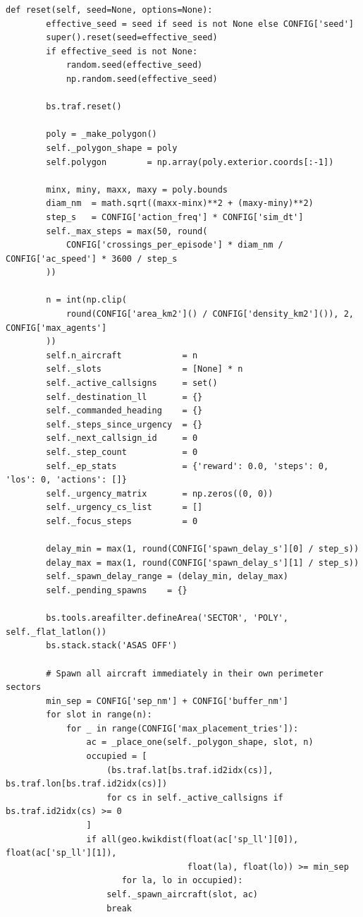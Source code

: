 \documentclass[10pt, a4paper]{article}
\begin{document}
\begin{lstlisting}[caption={v3\_simple\_env.py --- ATCO conflict-resolution environment}, label=lst:env]
    def reset(self, seed=None, options=None):
        effective_seed = seed if seed is not None else CONFIG['seed']
        super().reset(seed=effective_seed)
        if effective_seed is not None:
            random.seed(effective_seed)
            np.random.seed(effective_seed)

        bs.traf.reset()

        poly = _make_polygon()
        self._polygon_shape = poly
        self.polygon        = np.array(poly.exterior.coords[:-1])

        minx, miny, maxx, maxy = poly.bounds
        diam_nm  = math.sqrt((maxx-minx)**2 + (maxy-miny)**2)
        step_s   = CONFIG['action_freq'] * CONFIG['sim_dt']
        self._max_steps = max(50, round(
            CONFIG['crossings_per_episode'] * diam_nm / CONFIG['ac_speed'] * 3600 / step_s
        ))

        n = int(np.clip(
            round(CONFIG['area_km2']() / CONFIG['density_km2']()), 2, CONFIG['max_agents']
        ))
        self.n_aircraft            = n
        self._slots                = [None] * n
        self._active_callsigns     = set()
        self._destination_ll       = {}
        self._commanded_heading    = {}
        self._steps_since_urgency  = {}
        self._next_callsign_id     = 0
        self._step_count           = 0
        self._ep_stats             = {'reward': 0.0, 'steps': 0, 'los': 0, 'actions': []}
        self._urgency_matrix       = np.zeros((0, 0))
        self._urgency_cs_list      = []
        self._focus_steps          = 0

        delay_min = max(1, round(CONFIG['spawn_delay_s'][0] / step_s))
        delay_max = max(1, round(CONFIG['spawn_delay_s'][1] / step_s))
        self._spawn_delay_range = (delay_min, delay_max)
        self._pending_spawns    = {}

        bs.tools.areafilter.defineArea('SECTOR', 'POLY', self._flat_latlon())
        bs.stack.stack('ASAS OFF')

        # Spawn all aircraft immediately in their own perimeter sectors
        min_sep = CONFIG['sep_nm'] + CONFIG['buffer_nm']
        for slot in range(n):
            for _ in range(CONFIG['max_placement_tries']):
                ac = _place_one(self._polygon_shape, slot, n)
                occupied = [
                    (bs.traf.lat[bs.traf.id2idx(cs)], bs.traf.lon[bs.traf.id2idx(cs)])
                    for cs in self._active_callsigns if bs.traf.id2idx(cs) >= 0
                ]
                if all(geo.kwikdist(float(ac['sp_ll'][0]), float(ac['sp_ll'][1]),
                                    float(la), float(lo)) >= min_sep
                       for la, lo in occupied):
                    self._spawn_aircraft(slot, ac)
                    break


\end{lstlisting}
\end{document}
